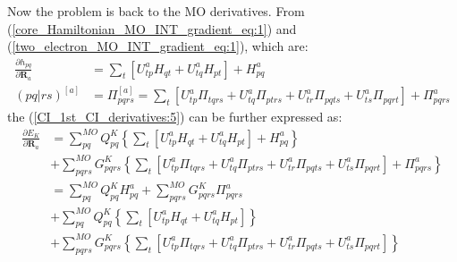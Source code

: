 Now the problem is back to the MO derivatives. From
(\ref{core_Hamiltonian_MO_INT_gradient_eq:1}) and
(\ref{two_electron_MO_INT_gradient_eq:1}), which are:
\begin{align}
 \label{CI_1st_CI_derivatives:6}
\frac{\partial h_{pq}}{\partial \bm{R}_{a}} &= \sum_{t}\left[U^{a}_{tp}H_{qt} +
U^{a}_{tq}H_{pt}\right]  + H^{a}_{pq} \nonumber \\
(pq|rs)^{[a]} &= \Pi_{pqrs}^{[a]} =\sum_{t}\left[ 
U^{a}_{tp}\Pi_{tqrs} +
U^{a}_{tq}\Pi_{ptrs} + 
U^{a}_{tr}\Pi_{pqts} + 
U^{a}_{ts}\Pi_{pqrt}  
\right] + \Pi^{a}_{pqrs}
\end{align}
the (\ref{CI_1st_CI_derivatives:5}) can be further expressed as:
\begin{align}
  \label{CI_1st_CI_derivatives:7}
 \frac{\partial E_{K}}{ \partial \bm{R}_{a}} &=
\sum_{pq}^{MO}Q^{K}_{pq}\left\lbrace \sum_{t}\left[U^{a}_{tp}H_{qt} +
U^{a}_{tq}H_{pt}\right]  + H^{a}_{pq} \right\rbrace \nonumber \\
&+
\sum_{pqrs}^{MO}G^{K}_{pqrs}\left\lbrace \sum_{t}\left[ 
U^{a}_{tp}\Pi_{tqrs} +
U^{a}_{tq}\Pi_{ptrs} + 
U^{a}_{tr}\Pi_{pqts} + 
U^{a}_{ts}\Pi_{pqrt}  
\right] + \Pi^{a}_{pqrs}\right\rbrace \nonumber \\
&= \sum_{pq}^{MO}Q^{K}_{pq}H^{a}_{pq} +
\sum_{pqrs}^{MO}G^{K}_{pqrs}\Pi^{a}_{pqrs} \nonumber \\
&+ \sum_{pq}^{MO}Q^{K}_{pq}\left\lbrace \sum_{t}\left[U^{a}_{tp}H_{qt} +
U^{a}_{tq}H_{pt}\right]  \right\rbrace \nonumber \\
&+ \sum_{pqrs}^{MO}G^{K}_{pqrs}\left\lbrace \sum_{t}\left[ 
U^{a}_{tp}\Pi_{tqrs} +
U^{a}_{tq}\Pi_{ptrs} + 
U^{a}_{tr}\Pi_{pqts} + 
U^{a}_{ts}\Pi_{pqrt}  
\right] \right\rbrace \nonumber \\
\end{align}

